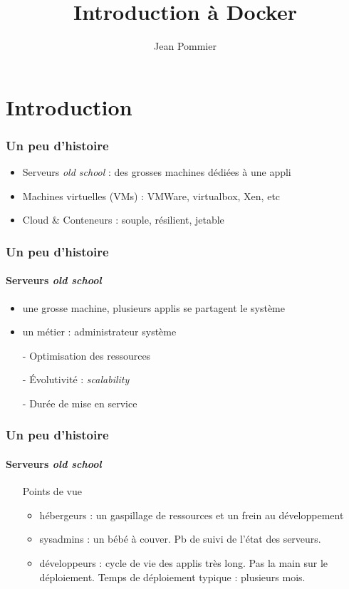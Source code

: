 \documentclass[11pt]{beamer}
\begin{document}
	\author{Jean Pommier}
	\title{Introduction à Docker}
	\begin{frame}[plain]
	\maketitle
\end{frame}

\section{Introduction}

\begin{frame}
\frametitle{Un peu d'histoire}
\begin{itemize}
\item Serveurs \textit{old school} : des grosses machines dédiées à une appli
\item Machines virtuelles (VMs) : VMWare, virtualbox, Xen, etc
\item Cloud \& Conteneurs : souple, résilient, jetable
\end{itemize}
\end{frame}

\begin{frame}
\frametitle{Un peu d'histoire}
\framesubtitle{Serveurs \em old school}
\begin{itemize}
	\item une grosse machine, plusieurs applis se partagent le système
	\item un métier : administrateur système
	\vspace{0.5em}
	\item[-] Optimisation des ressources
	\item[-] Évolutivité : \textit{scalability}
	\item[-] Durée de mise en service
\end{itemize}
\end{frame}

\begin{frame}
\frametitle{Un peu d'histoire}
\framesubtitle{Serveurs \em old school}
\begin{itemize}
	\item[] Points de vue
	\begin{itemize}
		\item hébergeurs : un gaspillage de ressources et un frein au développement
		\item sysadmins : un bébé à couver. Pb de suivi de l'état des serveurs. 
		\item développeurs : cycle de vie des applis très long. Pas la main sur le déploiement. Temps de déploiement typique : plusieurs mois.
	\end{itemize}
\end{itemize}
\end{frame}
\end{document}
